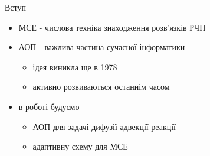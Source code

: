
\begin{frame}{Вступ}
	\begin{itemize}
		\item МСЕ - числова техніка знаходження розв'язків РЧП
		\item АОП - важлива частина сучасної інформатики
			\begin{itemize}
				\item{ідея виникла ще в 1978 \cite{babuvska1978posteriori}}
				\item активно розвиваються останнім часом \cite{ainsworth2011posteriori, eriksson1995introduction,verfurth1994posteriori,verfurth1996review}
			\end{itemize}
		\item в роботі будуємо
			\begin{itemize}
				\item АОП для задачі дифузії-адвекції-реакції
				\item адаптивну схему для МСЕ
			\end{itemize}
	\end{itemize}
\end{frame}
